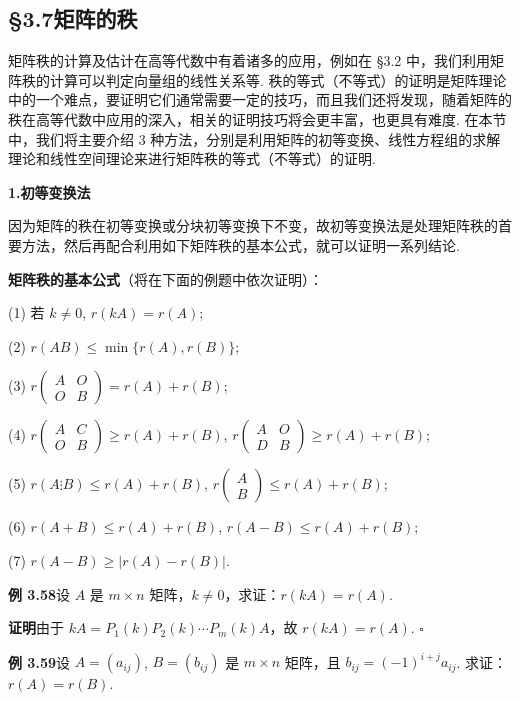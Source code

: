 \documentclass[UTF8, 12pt, fontset=fandol, oneside]{ctexart}
\begin{document}
\subsection*{§3.7\quad 矩阵的秩}

矩阵秩的计算及估计在高等代数中有着诸多的应用，例如在 §3.2 中，我们利用矩阵秩的计算可以判定向量组的线性关系等. 秩的等式（不等式）的证明是矩阵理论中的一个难点，要证明它们通常需要一定的技巧，而且我们还将发现，随着矩阵的秩在高等代数中应用的深入，相关的证明技巧将会更丰富，也更具有难度. 在本节中，我们将主要介绍 3 种方法，分别是利用矩阵的初等变换、线性方程组的求解理论和线性空间理论来进行矩阵秩的等式（不等式）的证明.

\noindent\textbf{1.\quad 初等变换法}

因为矩阵的秩在初等变换或分块初等变换下不变，故初等变换法是处理矩阵秩的首要方法，然后再配合利用如下矩阵秩的基本公式，就可以证明一系列结论.

\noindent\textbf{矩阵秩的基本公式}（将在下面的例题中依次证明）：

(1) 若 $k\ne 0$, $r(kA)=r(A)$;

(2) $r(AB)\le \min\{r(A),r(B)\}$;

(3) $r\begin{pmatrix}A&O\\O&B\end{pmatrix}=r(A)+r(B)$;

(4) $r\begin{pmatrix}A&C\\O&B\end{pmatrix}\ge r(A)+r(B)$, $r\begin{pmatrix}A&O\\D&B\end{pmatrix}\ge r(A)+r(B)$;

(5) $r(A\vdots B)\le r(A)+r(B)$, $r\begin{pmatrix}A\\B\end{pmatrix}\le r(A)+r(B)$;

(6) $r(A+B)\le r(A)+r(B)$, $r(A-B)\le r(A)+r(B)$;

(7) $r(A-B)\ge |r(A)-r(B)|$.

\noindent\textbf{例 3.58}\quad 设 $A$ 是 $m\times n$ 矩阵，$k\ne 0$，求证：$r(kA)=r(A)$.

\noindent\textbf{证明}\quad 由于 $kA=P_1(k)P_2(k)\cdots P_m(k)A$，故 $r(kA)=r(A)$. $\square$

\noindent\textbf{例 3.59}\quad 设 $A=(a_{ij})$, $B=(b_{ij})$ 是 $m\times n$ 矩阵，且 $b_{ij}=(-1)^{i+j}a_{ij}$. 求证：$r(A)=r(B)$.
\end{document}
